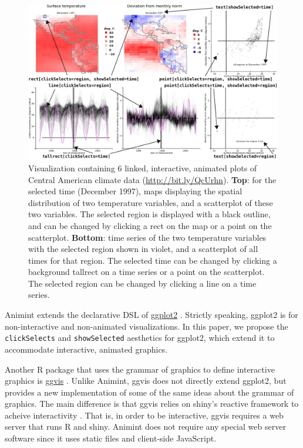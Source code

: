 \documentclass[10pt,journal,compsoc]{IEEEtran}\usepackage[]{graphicx}\usepackage[]{color}
\begin{document}
\begin{figure}[p]
  \centering
  \includegraphics[width=\textwidth]{figure-climate}
  \caption{Visualization containing 6 linked, interactive, animated
    plots of Central American climate data
    (\url{http://bit.ly/QcUrhn}). \textbf{Top}: for the selected time
    (December 1997), maps displaying the spatial distribution of two
    temperature variables, and a scatterplot of these two
    variables. The selected region is displayed with a black outline,
    and can be changed by clicking a rect on the map or a point on the
    scatterplot. \textbf{Bottom}: time series of the two temperature
    variables with the selected region shown in violet, and a
    scatterplot of all times for that region. The selected time can be
    changed by clicking a background tallrect on a time series or a
    point on the scatterplot. The selected region can be changed by
    clicking a line on a time series.}
  \label{fig:climate}
\end{figure}

Animint extends the declarative DSL of
\href{http://ggplot2.org/}{ggplot2} \citep{ggplot2-book,
  ggplot2-paper}. Strictly speaking, ggplot2 is for non-interactive
and non-animated visualizations. In this paper, we propose the
\texttt{clickSelects} and \texttt{showSelected} aesthetics for
ggplot2, which extend it to accommodate interactive, animated
graphics.

Another R package that uses the grammar of graphics to define
interactive graphics is \href{http://ggvis.rstudio.com/}{ggvis}
\citep{ggvis}. Unlike Animint, ggvis does not directly extend ggplot2,
but provides a new implementation of some of the same ideas about the
grammar of graphics. The main difference is that ggvis relies on
shiny's reactive framework to acheive interactivity
\citep{shiny}. That is, in order to be interactive, ggvis requires a
web server that runs R and shiny. Animint does not require any special
web server software since it uses static files and client-side
JavaScript.
\end{document}
